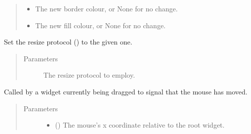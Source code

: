 \documentclass[letterpaper,10pt,english]{sphinxmanual}
\begin{document}
\begin{fulllineitems}
\begin{fulllineitems}
\begin{quote}
\begin{description}
\begin{itemize}
\item {} 
 \textendash{} The new border colour, or None for no change.

\item {} 
 \textendash{} The new fill colour, or None for no change.

\end{itemize}

\end{description}\end{quote}

\end{fulllineitems}


\begin{fulllineitems}
\label{\detokenize{api:gui.core.Grid.set_resize_protocol}}
Set the resize protocol () to the given one.
\begin{quote}\begin{description}
\item[{Parameters}] \leavevmode
{} \textendash{} The resize protocol to employ.

\end{description}\end{quote}

\end{fulllineitems}


\begin{fulllineitems}
\label{\detokenize{api:gui.core.Grid.signal_drag_motion}}
Called by a  widget currently being dragged to signal that the mouse has moved.
\begin{quote}\begin{description}
\item[{Parameters}] \leavevmode\begin{itemize}
\item {} 
 () \textendash{} The mouse’s x coordinate relative to the root widget.


\end{itemize}
\end{description}
\end{quote}
\end{fulllineitems}
\end{fulllineitems}
\end{document}
